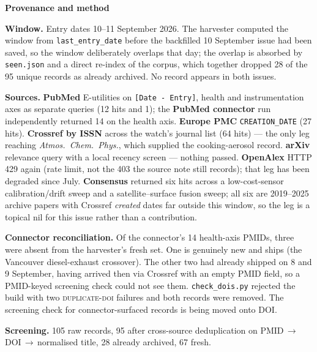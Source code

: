 \documentclass[10pt]{article}
\begin{document}
\vspace{4mm}
\begin{keybox}
{\sffamily\bfseries\footnotesize\color{Deep}Provenance and method}\\[1.2mm]
{\fontsize{7.2}{8.8}\selectfont
\textbf{Window.} Entry dates 10--11 September 2026. The harvester computed the window from
\texttt{last\_entry\_date} before the backfilled 10 September issue had been saved, so the
window deliberately overlaps that day; the overlap is absorbed by \texttt{seen.json} and a
direct re-index of the corpus, which together dropped 28 of the 95 unique records as
already archived. No record appears in both issues.\par
\vspace{0.8mm}
\textbf{Sources.} \textbf{PubMed} E-utilities on \texttt{[Date - Entry]}, health and
instrumentation axes as separate queries (12 hits and 1); the \textbf{PubMed connector} run
independently returned 14 on the health axis. \textbf{Europe PMC}
\texttt{CREATION\_DATE} (27 hits). \textbf{Crossref by ISSN} across the watch's journal
list (64 hits) --- the only leg reaching \textit{Atmos.\ Chem.\ Phys.}, which supplied the
cooking-aerosol record. \textbf{arXiv} relevance query with a local recency screen ---
nothing passed. \textbf{OpenAlex} HTTP 429 again (rate limit, not the 403 the source note
still records); that leg has been degraded since July. \textbf{Consensus} returned six hits
across a low-cost-sensor calibration/drift sweep and a satellite--surface fusion sweep;
all six are 2019--2025 archive papers with Crossref \emph{created} dates far outside this
window, so the leg is a topical nil for this issue rather than a contribution.\par
\vspace{0.8mm}
\textbf{Connector reconciliation.} Of the connector's 14 health-axis PMIDs, three were
absent from the harvester's fresh set. One is genuinely new and ships (the Vancouver
diesel-exhaust crossover). The other two had already shipped on 8 and 9 September, having
arrived then via Crossref with an empty PMID field, so a PMID-keyed screening check could
not see them. \texttt{check\_dois.py} rejected the build with two \textsc{duplicate-doi}
failures and both records were removed. The screening check for connector-surfaced records
is being moved onto DOI.\par
\vspace{0.8mm}
\textbf{Screening.} 105 raw records, 95 after cross-source deduplication on
PMID\,$\rightarrow$\,DOI\,$\rightarrow$\,normalised title, 28 already archived, 67 fresh.
}
\end{keybox}
\end{document}
